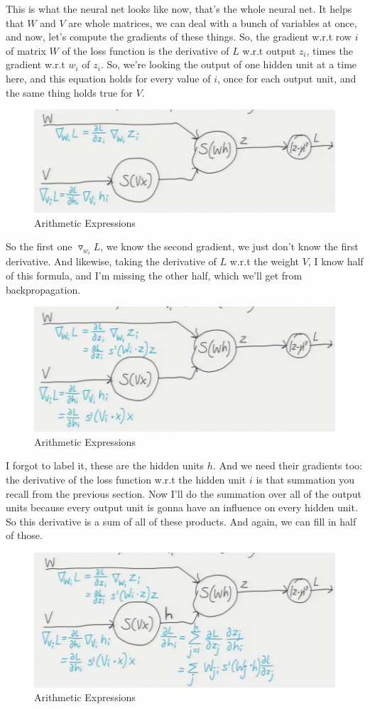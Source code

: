 \documentclass[fleqn,10pt]{olplainarticle}
\theoremstyle{definition}
\theoremstyle{remark}
\begin{document}
This is what the neural net looks like now, that's the whole neural net. It helps that $W$ and $V$ are whole matrices, we can deal with a bunch of variables at once, and now, let's compute the gradients of these things. So, the gradient w.r.t row $i$ of matrix $W$ of the loss function is the derivative of $L$ w.r.t output $z_i$, times the gradient w.r.t $w_i$ of $z_i$. So, we're looking the output of one hidden unit at a time here, and this equation holds for every value of $i$, once for each output unit, and the same thing holds true for $V$. 
\begin{figure}[ht]
\centering
\includegraphics[width=0.7\linewidth]{images/arithmetic_expression_18}
\caption{Arithmetic Expressions}
\label{fig:arithmetic_expression_18}
\end{figure}

So the first one $\triangledown_{w_i} L$, we know the second gradient, we just don't know the first derivative. And likewise, taking the derivative of $L$ w.r.t the weight $V$, I know half of this formula, and I'm missing the other half, which we'll get from backpropagation.
\begin{figure}[ht]
\centering
\includegraphics[width=0.7\linewidth]{images/arithmetic_expression_19}
\caption{Arithmetic Expressions}
\label{fig:arithmetic_expression_19}
\end{figure}

I forgot to label it, these are the hidden units $h$. And we need their gradients too: the derivative of the loss function w.r.t the hidden unit $i$ is that summation you recall from the previous section. Now I'll do the summation over all of the output units because every output unit is gonna have an influence on every hidden unit. So this derivative is a sum of all of these products. And again, we can fill in half of those.
\begin{figure}[ht]
\centering
\includegraphics[width=0.7\linewidth]{images/arithmetic_expression_20}
\caption{Arithmetic Expressions}
\label{fig:arithmetic_expression_20}
\end{figure}
\end{document}
